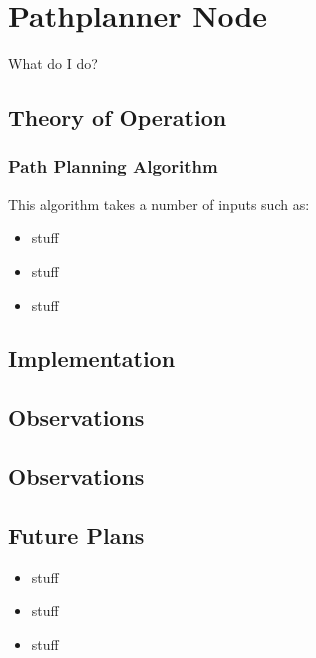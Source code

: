 \section{Pathplanner Node}

What do I do?

\subsection{Theory of Operation}


\subsubsection{Path Planning Algorithm}
 This algorithm takes a number
of inputs such as:


\begin{itemize}
\item
  stuff
\item
  stuff
\item
  stuff
\end{itemize}


\subsection{Implementation}


\subsection{Observations}


\subsection{Observations}


\subsection{Future Plans}

\begin{itemize}
\item
  stuff
\item
  stuff
\item
  stuff
\end{itemize}
